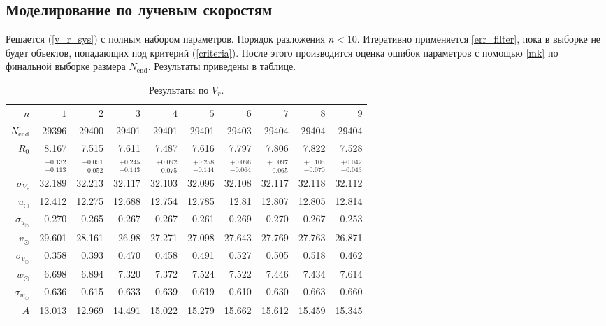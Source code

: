 \documentclass{matmex-diploma-custom}
\begin{document}
\pagebreak
\subsection{Моделирование по лучевым скоростям} \label{vr_res}
Решается (\ref{v_r_sys}) с полным набором параметров. Порядок разложения $n < 10$. Итеративно применяется \ref{err_filter}, пока в выборке не будет объектов, попадающих под критерий (\ref{criteria}). После этого производится оценка ошибок параметров с помощью \ref{mk} по финальной выборке размера $N_{\mathrm{end}}$. Результаты приведены в таблице. 
\begin{table}[h!!]
\centering
\caption{Результаты по $V_r$.}
\begin{tabular}{r|rr|r|rrrrrr}
\hline
 $n$ & $1$ & $2$ & $3$ & $4$ & $5$&$ 6 $&$ 7 $&$ 8 $&$ 9 $\\
 $N_{\mathrm{end}}$ & 29396       &   29400 &   29401 &   29401 &   29401 &   29403 &   29404 &   29404 &   29404  \\
 $R_0 $& 8.167       &   7.515 &   7.611 &   7.487 &   7.616 &   7.797 &   7.806 &   7.822 &   7.528  \\
       & $_{-0.113}^{+0.132} $ & $_{-0.052}^{+0.051}$  & $_{-0.143}^{+0.245}$   & $_{-0.075}^{+0.092}$  & $_{-0.144}^{+0.258}$  & $_{-0.064}^{+0.096}$  & $_{-0.065}^{+0.097}$  & $_{-0.070}^{+0.105}$  & $_{-0.043}^{+0.042}$  \\\hline
 $\sigma_{V_r} $& 32.189      &  32.213 &  32.117 &  32.103 &  32.096 &  32.108 &  32.117 &  32.118 &  32.112  \\
 $ u_{\odot} $& 12.412      &  12.275 &  12.688 &  12.754 &  12.785 &   12.81 &  12.807 &  12.805 &  12.814  \\
 $\sigma_{u_{\odot}} $&0.270       &   0.265 &   0.267 &   0.267 &   0.261 &   0.269 &    0.270 &   0.267 &   0.253  \\
 $v_{\odot} $& 29.601      &  28.161 &   26.98 &  27.271 &  27.098 &  27.643 &  27.769 &  27.763 &  26.871  \\
 $\sigma_{v_{\odot}}$&0.358       &   0.393 &    0.470 &   0.458 &   0.491 &   0.527 &   0.505 &   0.518 &   0.462  \\
 $w_{\odot} $&6.698       &   6.894 &    7.320 &   7.372 &   7.524 &   7.522 &   7.446 &   7.434 &   7.614  \\
 $\sigma_{w_{\odot}} $& 0.636       &   0.615 &   0.633 &   0.639 &   0.619 &    0.610 &    0.630 &   0.663 &    0.660  \\\hline
 $A $&13.013      &  12.969 &  14.491 &  15.022 &  15.279 &  15.662 &  15.612 &  15.459 &  15.345  \\

\end{tabular}
\end{table}
\end{document}
